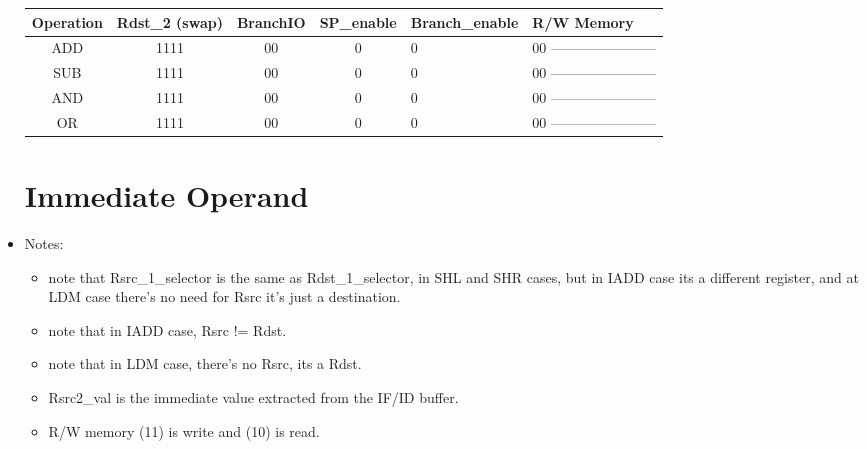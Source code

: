 \documentclass[12pt]{report}
\begin{document}
\begin{itemize}
\begin{center}
\begin{tabular}{||c| c| c| c| p{40mm}||}
        \hline

        \end{tabular}
        \end{center}

        \begin{center}
        \begin{tabular}{||c| c| c| c| p{40mm}||} 
        \hline
        Operation & Rdst_2 (swap) & BranchIO & SP_enable & Branch_enable & R/W Memory  \\ [0.5ex] 
        \hline\hline
        ADD & 1111 & 00 & 0 & 0 & 00 ----------------------- \\
        SUB & 1111 & 00 & 0 & 0 & 00 ----------------------- \\
        AND & 1111 & 00 & 0 & 0 & 00 ----------------------- \\
        OR & 1111 & 00 & 0 & 0 & 00 ----------------------- \\
        \hline

        \end{tabular}
        \end{center}


        \section{Immediate Operand}
        \item Notes:
        \begin{itemize}
            \item note that Rsrc_1_selector is the same as Rdst_1_selector, in SHL and SHR cases, but in IADD case its a different register, and at LDM case there's no need for Rsrc it's just a destination.
            \item note that in IADD case, Rsrc != Rdst.
            \item note that in LDM case, there's no Rsrc, its a Rdst.
            \item Rsrc2_val is the immediate value extracted from the IF/ID buffer.
            \item R/W memory (11) is write and (10) is read.
        \end{itemize}


\end{itemize}
\end{document}
